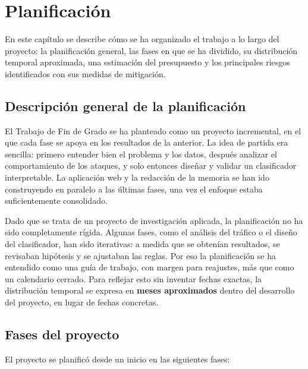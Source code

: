 \chapter{Planificación}
\label{cap:planificacion}

En este capítulo se describe cómo se ha organizado el trabajo a lo largo del proyecto: la planificación general, las fases en que se ha dividido, su distribución temporal aproximada, una estimación del presupuesto y los principales riesgos identificados con sus medidas de mitigación.

\section{Descripción general de la planificación}
\label{sec:plan_general}

El Trabajo de Fin de Grado se ha planteado como un proyecto incremental, en el que cada fase se apoya en los resultados de la anterior. La idea de partida era sencilla: primero entender bien el problema y los datos, después analizar el comportamiento de los ataques, y solo entonces diseñar y validar un clasificador interpretable. La aplicación web y la redacción de la memoria se han ido construyendo en paralelo a las últimas fases, una vez el enfoque estaba suficientemente consolidado.

Dado que se trata de un proyecto de investigación aplicada, la planificación no ha sido completamente rígida. Algunas fases, como el análisis del tráfico o el diseño del clasificador, han sido iterativas: a medida que se obtenían resultados, se revisaban hipótesis y se ajustaban las reglas. Por eso la planificación se ha entendido como una guía de trabajo, con margen para reajustes, más que como un calendario cerrado. Para reflejar esto sin inventar fechas exactas, la distribución temporal se expresa en \textbf{meses aproximados} dentro del desarrollo del proyecto, en lugar de fechas concretas.

\section{Fases del proyecto}
\label{sec:plan_fases}

El proyecto se planificó desde un inicio en las siguientes fases:

